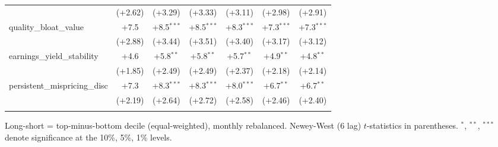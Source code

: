 \begin{table}[htbp]
\begin{threeparttable}
\begin{tabular}{lcccccc}
 & (+2.62) & (+3.29) & (+3.33) & (+3.11) & (+2.98) & (+2.91) \\
\addlinespace
quality\_bloat\_value & +7.5 & +8.5$^{***}$ & +8.5$^{***}$ & +8.3$^{***}$ & +7.3$^{***}$ & +7.3$^{***}$ \\
 & (+2.88) & (+3.44) & (+3.51) & (+3.40) & (+3.17) & (+3.12) \\
\addlinespace
earnings\_yield\_stability & +4.6 & +5.8$^{**}$ & +5.8$^{**}$ & +5.7$^{**}$ & +4.9$^{**}$ & +4.8$^{**}$ \\
 & (+1.85) & (+2.49) & (+2.49) & (+2.37) & (+2.18) & (+2.14) \\
\addlinespace
persistent\_mispricing\_disc & +7.3 & +8.3$^{***}$ & +8.3$^{***}$ & +8.0$^{***}$ & +6.7$^{**}$ & +6.7$^{**}$ \\
 & (+2.19) & (+2.64) & (+2.72) & (+2.58) & (+2.46) & (+2.40) \\
\addlinespace
\bottomrule
\end{tabular}
\begin{tablenotes}\footnotesize
\item Long-short = top-minus-bottom decile (equal-weighted), monthly rebalanced. Newey-West (6 lag) $t$-statistics in parentheses. $^{*}$, $^{**}$, $^{***}$ denote significance at the 10\%, 5\%, 1\% levels.
\end{tablenotes}
\end{threeparttable}
\end{table}